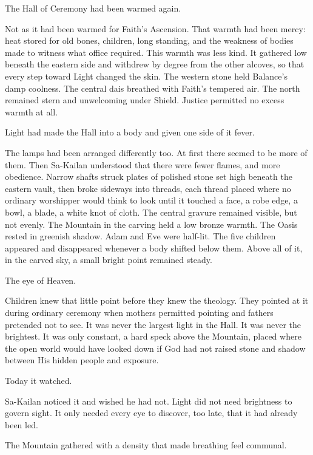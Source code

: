 

\noindent The Hall of Ceremony had been warmed again.\par
Not as it had been warmed for Faith’s Ascension.
That warmth had been mercy: heat stored for old bones, children, long standing, and the weakness of bodies made to witness what office required.
This warmth was less kind.
It gathered low beneath the eastern side and withdrew by degree from the other alcoves, so that every step toward Light changed the skin.
The western stone held Balance’s damp coolness.
The central dais breathed with Faith’s tempered air.
The north remained stern and unwelcoming under Shield.
Justice permitted no excess warmth at all.\par
Light had made the Hall into a body and given one side of it fever.\par
The lamps had been arranged differently too.
At first there seemed to be more of them.
Then Sa-Kailan understood that there were fewer flames, and more obedience.
Narrow shafts struck plates of polished stone set high beneath the eastern vault, then broke sideways into threads, each thread placed where no ordinary worshipper would think to look until it touched a face, a robe edge, a bowl, a blade, a white knot of cloth.
The central gravure remained visible, but not evenly.
The Mountain in the carving held a low bronze warmth.
The Oasis rested in greenish shadow.
Adam and Eve were half-lit.
The five children appeared and disappeared whenever a body shifted below them.
Above all of it, in the carved sky, a small bright point remained steady.\par
The eye of Heaven.\par
Children knew that little point before they knew the theology.
They pointed at it during ordinary ceremony when mothers permitted pointing and fathers pretended not to see.
It was never the largest light in the Hall.
It was never the brightest.
It was only constant, a hard speck above the Mountain, placed where the open world would have looked down if God had not raised stone and shadow between His hidden people and exposure.\par
Today it watched.\par
Sa-Kailan noticed it and wished he had not.
Light did not need brightness to govern sight.
It only needed every eye to discover, too late, that it had already been led.\par
The Mountain gathered with a density that made breathing feel communal.\par

